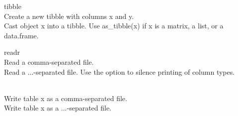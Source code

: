 
\vspace{3.5ex}

\begin{block}{tibble}
   \\ Create a new tibble with columns x and y.\br
   \\ Cast object x into a tibble.\br
  Use as\_tibble(x) if x is a matrix, a list, or a data.frame.
\end{block}

\vspace{4ex}

\begin{block}{readr}
     \\ Read a comma-separated file.\br
     \\ Read a ...-separated file.\br
    Use the option  to silence printing of column types.

    \\ Write table x as a comma-separated file.\br
     \\ Write table x as a ...-separated file.
\end{block}
